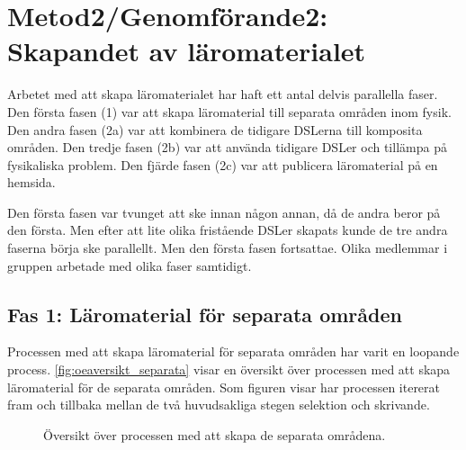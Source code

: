 
\chapter{Metod2/Genomförande2: Skapandet av läromaterialet}
\begin{draft}

Arbetet med att skapa läromaterialet har haft ett antal delvis parallella faser. Den första fasen (1) var att skapa läromaterial till separata områden inom fysik. Den andra fasen (2a) var att kombinera de tidigare DSLerna till komposita områden. Den tredje fasen (2b) var att använda tidigare DSLer och tillämpa på fysikaliska problem. Den fjärde fasen (2c) var att publicera läromaterial på en hemsida.

Den första fasen var tvunget att ske innan någon annan, då de andra beror på den första. Men efter att lite olika fristående DSLer skapats kunde de tre andra faserna börja ske parallellt. Men den första fasen fortsattae. Olika medlemmar i gruppen arbetade med olika faser samtidigt.

\section{Fas 1: Läromaterial för separata områden}

Processen med att skapa läromaterial för separata områden har varit en loopande process. \ref{fig:oeaversikt_separata} visar en översikt över processen med att skapa läromaterial för de separata områden. Som figuren visar har processen itererat fram och tillbaka mellan de två huvudsakliga stegen selektion och skrivande.

\begin{figure}
  \caption{Översikt över processen med att skapa de separata områdena.}
  \label{fig:oeversikt_separata}
\end{figure}


\end{draft}
